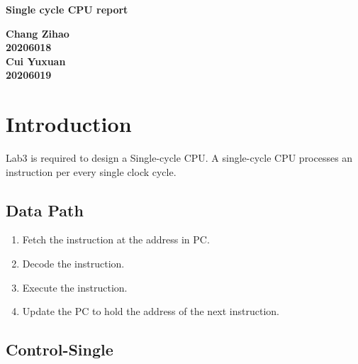 \documentclass[12pt,a4paper]{article}
\begin{document}
\begin{titlepage}
  \begin{center}
    \vspace*{1cm}

    \textbf{\Huge Single cycle CPU  report}

    \vspace{0.5cm}

         
    \vspace{1.5cm}

    \textbf{\large Chang Zihao \\20206018\\\large Cui Yuxuan\\20206019}

    \vfill
         

         
    \vspace{0.8cm}
  


         
\end{center}
\end{titlepage}


\newpage
\tableofcontents
\thispagestyle{empty}

\newpage
{}
\setcounter{page}{1}

\section{Introduction}

Lab3 is required to design a Single-cycle CPU.
A single-cycle CPU processes an instruction per every single clock cycle.

\subsection{Data Path}

\begin{enumerate}
\item Fetch the instruction at the address in PC.
\item Decode the instruction.
\item Execute the instruction.
\item Update the PC to hold the address of the next instruction. 
\end{enumerate}

\subsection{Control-Single}
\end{document}
